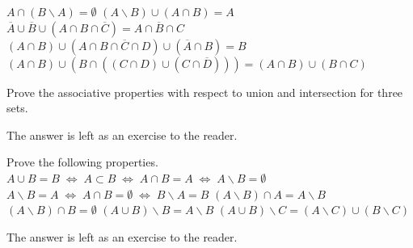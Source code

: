\begin{Answer}\phantom{}
    
        \Question $A \cap (B \backslash A) = \emptyset $
        \Question $(A \backslash B) \cup (A \cap B) = A$
        \Question $\overline{A} \cup \overline{B} \cup \left( A \cap B \cap \overline{C} \right) = \overline{A \cap B \cap C}$
        \Question $(A \cap B) \cup \left( A \cap B \cap \overline{C} \cap D \right) \cup \left( \overline{A} \cap B \right) = B$
        \Question $(A \cap B) \cup \left(B \cap \left( \left(C\cap D\right)\cup \left(C \cap \overline{D} \right) \right) \right) = (A \cap B) \cup (B \cap C) $
\end{Answer}

\ifanalysis


\begin{Exercise} [difficulty = 1] Prove the associative properties with respect to union and intersection for three sets. 
\end{Exercise}

\begin{Answer}\phantom{}
The answer is left as an exercise to the reader. 
\end{Answer}
		
\begin{Exercise} Prove the following properties. %
		\Question[difficulty = 1] $A\cup B=B \; \Leftrightarrow \; A\subset B \; \Leftrightarrow\;  A\cap
		B=A \; \Leftrightarrow \; A\backslash B=\emptyset$
		\Question[difficulty = 1] $A\backslash B=A \; \Leftrightarrow \; A \cap B =\emptyset \; \Leftrightarrow \;
		B \backslash A=B$
		\Question[difficulty = 1] $(A\backslash B)\cap A=A\backslash B$
		\Question[difficulty = 1] $(A\backslash B)\cap B=\emptyset$
		\Question[difficulty = 1] $(A\cup B)\backslash B=A\backslash B$
		\Question[difficulty = 1] $(A\cup B)\backslash C=(A\backslash C)\cup (B\backslash C)$
\end{Exercise}

\begin{Answer}\phantom{}
The answer is left as an exercise to the reader.
\end{Answer}


\fi
\newpage

